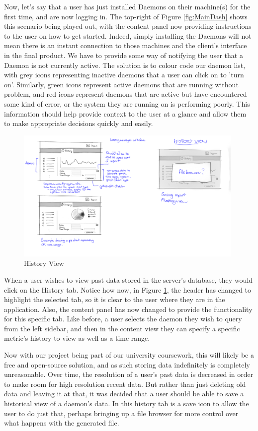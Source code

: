 \documentclass{l3proj}
\begin{document}
Now, let's say that a user has just installed Daemons on their machine(s) for the first time, and are now logging in. The top-right of Figure \ref{fig:MainDash} shows this scenario being played out, with the content panel now providing instructions to the user on how to get started. Indeed, simply installing the Daemons will not mean there is an instant connection to those machines and the client's interface in the final product. We have to provide some way of notifying the user that a Daemon is not currently active. The solution is to colour code our daemon list, with grey icons representing inactive daemons that a user can click on to 'turn on'. Similarly, green icons represent active daemons that are running without problem, and red icons represent daemons that are active but have encountered some kind of error, or the system they are running on is performing poorly. This information should help provide context to the user at a glance and allow them to make appropriate decisions quickly and easily.

\begin{figure}[H]
\centering
\includegraphics[width=110mm]{Concept_Designs/HistoryView.png}
\caption{History View}
\label{fig:HistoryView}
\end{figure}

When a user wishes to view past data stored in the server's database, they would click on the History tab. Notice how now, in Figure \ref{fig:HistoryView}, the header has changed to highlight the selected tab, so it is clear to the user where they are in the application. Also, the content panel has now changed to provide the functionality for this specific tab. Like before, a user selects the daemon they wish to query from the left sidebar, and then in the content view they can specify a specific metric's history to view as well as a time-range.

Now with our project being part of our university coursework, this will likely be a free and open-source solution, and as such storing data indefinitely is completely unreasonable. Over time, the resolution of a user's past data is decreased in order to make room for high resolution recent data. But rather than just deleting old data and leaving it at that, it was decided that a user should be able to save a historical view of a daemon's data. In this history tab is a save icon to allow the user to do just that, perhaps bringing up a file browser for more control over what happens with the generated file.
\end{document}
